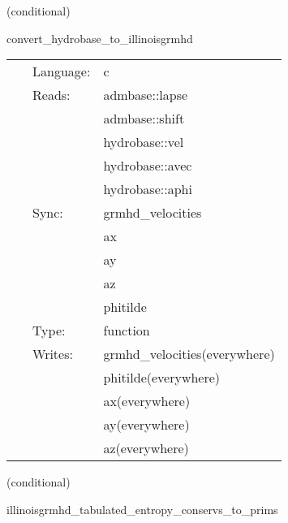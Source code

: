    (conditional) 

\hspace{5mm} convert\_hydrobase\_to\_illinoisgrmhd 

\hspace{5mm}{\it convert hydrobase initial data (id) to illinoisgrmhd variables } 


\hspace{5mm}

 \begin{tabular*}{160mm}{cll} 
~ & Language:  & c \\ 
~ & Reads:  & admbase::lapse \\ 
~& ~ &admbase::shift\\ 
~& ~ &hydrobase::vel\\ 
~& ~ &hydrobase::avec\\ 
~& ~ &hydrobase::aphi\\ 
~ & Sync:  & grmhd\_velocities \\ 
~& ~ &ax\\ 
~& ~ &ay\\ 
~& ~ &az\\ 
~& ~ &phitilde\\ 
~ & Type:  & function \\ 
~ & Writes:  & grmhd\_velocities(everywhere) \\ 
~& ~ &phitilde(everywhere)\\ 
~& ~ &ax(everywhere)\\ 
~& ~ &ay(everywhere)\\ 
~& ~ &az(everywhere)\\ 
\end{tabular*} 


\vspace{5mm}

   (conditional) 

\hspace{5mm} illinoisgrmhd\_tabulated\_entropy\_conservs\_to\_prims 

\hspace{5mm}{\it entropy+tabulated version of illinoisgrmhd\_conservs\_to\_prims } 


\hspace{5mm}

